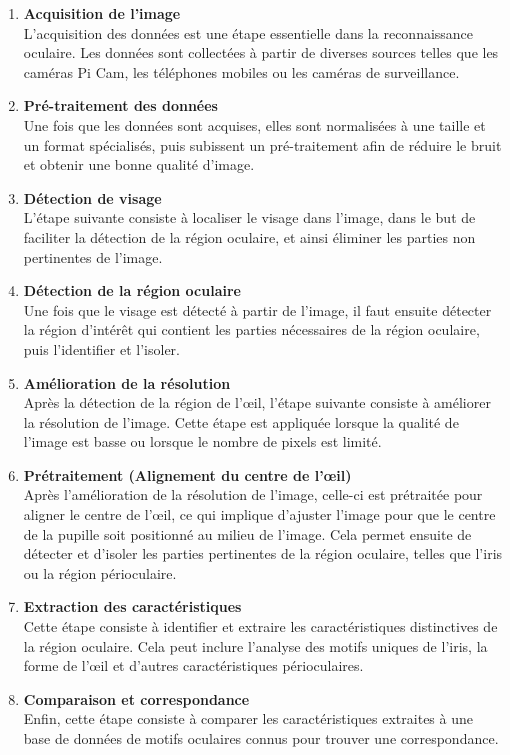 \begin{enumerate}
   \item \textbf{Acquisition de l'image}\\
    L'acquisition des données est une étape essentielle dans la reconnaissance oculaire. Les données sont collectées à partir de diverses sources telles que les caméras Pi Cam, les téléphones mobiles ou les caméras de surveillance.
   \item \textbf{Pré-traitement des données}\\
     Une fois que les données sont acquises, elles sont normalisées à une taille et un format spécialisés, puis subissent un pré-traitement afin de réduire le bruit et obtenir une bonne qualité d'image.
   \item \textbf{Détection de visage}\\
   L'étape suivante consiste à localiser le visage dans l'image, dans le but de faciliter la détection de la région oculaire, et ainsi éliminer les parties non pertinentes de l'image.
   \item \textbf{Détection de la région oculaire}\\
   Une fois que le visage est détecté à partir de l'image, il faut ensuite détecter la région d'intérêt qui contient les parties nécessaires de la région oculaire, puis l'identifier et l'isoler.
   \item \textbf{Amélioration de la résolution}\\
   Après la détection de la région de l’œil, l'étape suivante consiste à améliorer la résolution de l'image. Cette étape est appliquée lorsque la qualité de l'image est basse ou lorsque le nombre de pixels est limité.
   \item \textbf{Prétraitement (Alignement du centre de l'œil)}\\
   Après l'amélioration de la résolution de l'image, celle-ci est prétraitée pour aligner le centre de l’œil, ce qui implique d'ajuster l'image pour que le centre de la pupille soit positionné au milieu de l’image. Cela permet ensuite de détecter et d’isoler les parties pertinentes de la région oculaire, telles que l’iris ou la région périoculaire.
   \item \textbf{Extraction des caractéristiques}\\
   Cette étape consiste à identifier et extraire les caractéristiques distinctives de la région oculaire. Cela peut inclure l’analyse des motifs uniques de l’iris, la forme de l’œil et d’autres caractéristiques périoculaires.
   \item \textbf{Comparaison et correspondance}\\
   Enfin, cette étape consiste à comparer les caractéristiques extraites à une base de données de motifs oculaires connus pour trouver une correspondance.
\end{enumerate}



